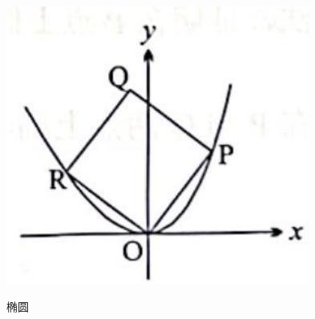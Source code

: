 \documentclass[10pt]{article}
\begin{document}
\begin{enumerate}
\begin{center}
\includegraphics[max width=\textwidth]{2024_06_05_971e6815482d5ecd2718g-18}
\end{center}

\end{enumerate}

椭圆
\end{document}
